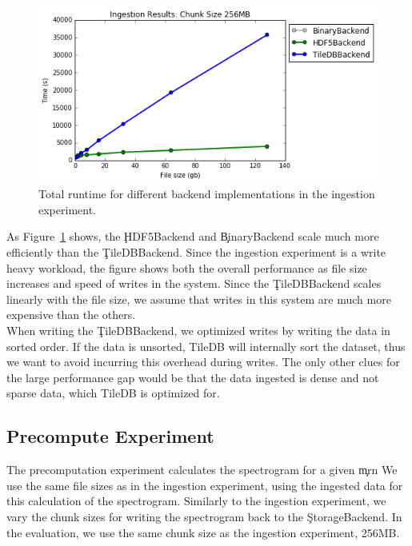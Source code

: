 \begin{figure}[h]
\begin{center}
\includegraphics[scale=.75]{./img/ingestion-exp.png}
\caption{Total runtime for different backend implementations in the ingestion
  experiment.}
\label{fig:ingestion-exp}
\end{center}
\end{figure}

As Figure~\ref{fig:ingestion-exp} shows, the \c{HDF5Backend} and
\c{BinaryBackend} scale much more efficiently than the \c{TileDBBackend}. Since
the ingestion experiment is a write heavy workload, the figure shows both the
overall performance as file size increases and speed of writes in the system.
Since the \c{TileDBBackend} scales linearly with the file size, we assume that writes
in this system are much more expensive than the others. \\

When writing the \c{TileDBBackend}, we optimized writes by writing the data in
sorted order. If the data is unsorted, TileDB will internally sort the dataset,
thus we want to avoid incurring this overhead during writes. The only other
clues for the large performance gap would be that the data ingested is dense
and not sparse data, which TileDB is optimized for.

\subsection{Precompute Experiment}\label{storage-ch:precompute-exp}

The precomputation experiment calculates the spectrogram for a given \c{mrn} We
use the same file sizes as in the ingestion experiment, using the ingested data
for this calculation of the spectrogram. Similarly to the ingestion experiment,
we vary the chunk sizes for writing the spectrogram back to the
\c{StorageBackend}. In the evaluation, we use the same chunk size as the
ingestion experiment, 256MB. \\

